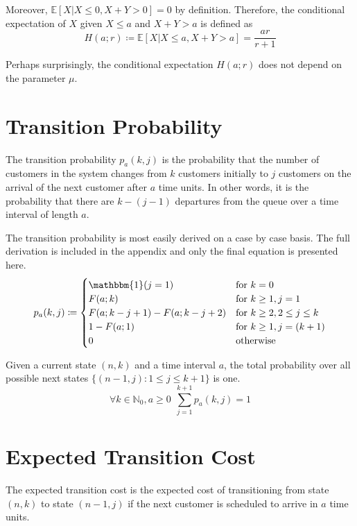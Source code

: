 Moreover, $\mathbb{E} [X | X \leq 0, X + Y > 0] = 0$ by definition. Therefore, the conditional expectation of $X$ given $X \leq a$ and $X + Y > a$ is defined as
\begin{equation}
	H (a; r) \coloneqq \mathbb{E} [X | X \leq a, X + Y > a] = \frac{a r}{r + 1}
\end{equation}

Perhaps surprisingly, the conditional expectation $H (a; r)$ does not depend on the parameter $\mu$.

\section{Transition Probability}
The transition probability $p_{a} (k, j)$ is the probability that the number of customers in the system changes from $k$ customers initially to $j$ customers on the arrival of the next customer after $a$ time units. In other words, it is the probability that there are $k - (j - 1)$ departures from the queue over a time interval of length $a$.

The transition probability is most easily derived on a case by case basis. The full derivation is included in the appendix and only the final equation is presented here.
\begin{equation}
	p_{a} (k, j) \coloneqq \begin{cases}
		\mathbbm{1} (j = 1) & \text{for $k = 0$} \\
		F (a; k) & \text{for $k \geq 1, j = 1$} \\
		F (a; k - j + 1) - F (a; k - j + 2) & \text{for $k \geq 2, 2 \leq j \leq k$} \\
		1 - F (a; 1) & \text{for $k \geq 1, j = (k + 1)$} \\
		0 & \text{otherwise}
	\end{cases}
\end{equation}

Given a current state $(n, k)$ and a time interval $a$, the total probability over all possible next states $\big\{ (n - 1, j) : 1 \leq j \leq k + 1 \big\}$ is one.
\begin{equation}
	\forall k \in \mathbb{N}_{0}, a \geq 0 \ \ \sum_{j = 1}^{k + 1} p_{a} (k, j) = 1
\end{equation}

\section{Expected Transition Cost}
The expected transition cost is the expected cost of transitioning from state $(n, k)$ to state $(n - 1, j)$ if the next customer is scheduled to arrive in $a$ time units.

